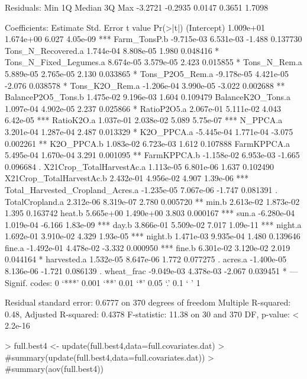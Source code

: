 \documentclass{report}
\begin{document}
\begin{Schunk}
\begin{Soutput}
Residuals:
    Min      1Q  Median      3Q     Max 
-3.2721 -0.2935  0.0147  0.3651  1.7098 

Coefficients:
                                   Estimate Std. Error t value Pr(>|t|)    
(Intercept)                       1.009e+01  1.674e+00   6.027 4.05e-09 ***
Farm_TonsP.b                     -9.715e-03  6.531e-03  -1.488 0.137730    
Tons_N_Recovered.a                1.744e-04  8.808e-05   1.980 0.048416 *  
Tons_N_Fixed_Legumes.a            8.674e-05  3.579e-05   2.423 0.015855 *  
Tons_N_Rem.a                      5.889e-05  2.765e-05   2.130 0.033865 *  
Tons_P2O5_Rem.a                  -9.178e-05  4.421e-05  -2.076 0.038578 *  
Tons_K2O_Rem.a                   -1.206e-04  3.990e-05  -3.022 0.002688 ** 
BalanceP2O5_Tons.b                1.475e-02  9.196e-03   1.604 0.109479    
BalanceK2O_Tons.a                 1.097e-04  4.902e-05   2.237 0.025866 *  
RatioP2O5.a                       2.067e-01  5.111e-02   4.043 6.42e-05 ***
RatioK2O.a                        1.037e-01  2.038e-02   5.089 5.75e-07 ***
N_PPCA.a                          3.201e-04  1.287e-04   2.487 0.013329 *  
K2O_PPCA.a                       -5.445e-04  1.771e-04  -3.075 0.002261 ** 
K2O_PPCA.b                        1.083e-02  6.723e-03   1.612 0.107888    
FarmKPPCA.a                       5.495e-04  1.670e-04   3.291 0.001095 ** 
FarmKPPCA.b                      -1.158e-02  6.953e-03  -1.665 0.096684 .  
X21Crop_TotalHarvestAc.a          1.113e-05  6.801e-06   1.637 0.102490    
X21Crop_TotalHarvestAc.b          2.432e-01  4.956e-02   4.907 1.39e-06 ***
Total_Harvested_Cropland_Acres.a -1.235e-05  7.067e-06  -1.747 0.081391 .  
TotalCropland.a                   2.312e-06  8.319e-07   2.780 0.005720 ** 
min.b                             2.613e-02  1.873e-02   1.395 0.163742    
heat.b                            5.665e+00  1.490e+00   3.803 0.000167 ***
sun.a                            -6.280e-04  1.019e-04  -6.166 1.83e-09 ***
day.b                             3.866e-01  5.509e-02   7.017 1.09e-11 ***
night.a                           1.692e-01  3.910e-02   4.329 1.93e-05 ***
night.b                           1.471e-03  9.935e-04   1.480 0.139646    
fine.a                           -1.492e-01  4.478e-02  -3.332 0.000950 ***
fine.b                            6.301e-02  3.120e-02   2.019 0.044164 *  
harvested.a                       1.532e-05  8.647e-06   1.772 0.077275 .  
acres.a                          -1.400e-05  8.136e-06  -1.721 0.086139 .  
wheat_frac                       -9.049e-03  4.378e-03  -2.067 0.039451 *  
---
Signif. codes:  0 ‘***’ 0.001 ‘**’ 0.01 ‘*’ 0.05 ‘.’ 0.1 ‘ ’ 1

Residual standard error: 0.6777 on 370 degrees of freedom
Multiple R-squared:   0.48,	Adjusted R-squared:  0.4378 
F-statistic: 11.38 on 30 and 370 DF,  p-value: < 2.2e-16
\end{Soutput}
\begin{Sinput}
> full.best4 <- update(full.best4,data=full.covariates.dat)
> #summary(update(full.best4,data=full.covariates.dat))
> #summary(aov(full.best4))
\end{Sinput}
\end{Schunk}
\end{document}

